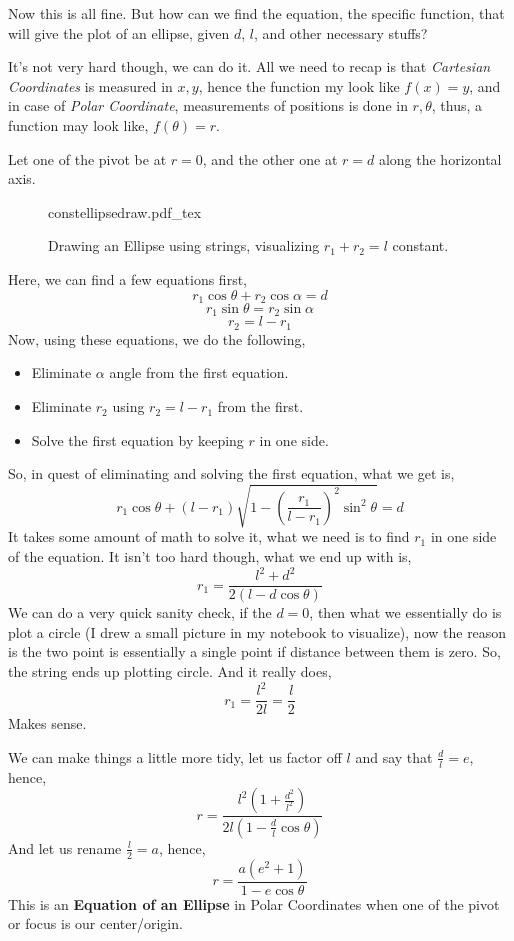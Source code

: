 \documentclass[12pt,a4paper]{article}
\newcommand{\incfig}[1]{%
    \def\svgwidth{0.7\columnwidth}
    {#1.pdf_tex}
}
\begin{document}
Now this is all fine. But how can we find the equation, the specific function, that will give the plot of an ellipse, given $d$, $l$, and other necessary stuffs? 

It's not very hard though, we can do it. All we need to recap is that \emph{Cartesian Coordinates} is measured in $x,y$, hence the function my look like $f(x) = y$, and in case of \emph{Polar Coordinate}, measurements of positions is done in $r,\theta$, thus, a function may look like, $f( \theta) = r$.





Let one of the pivot be at $r= 0$, and the other one at $r= d$ along the horizontal axis. 
\begin{figure}[ht!]
    \centering
    \incfig{constellipsedraw}
    \caption{Drawing an Ellipse using strings, visualizing $r_1 + r_2 = l$ constant.}
    \label{fig:constellipsedraw}
\end{figure}

Here, we can find a few equations first,
\[ 
r_1 \cos \theta + r_2 \cos \alpha = d
\]
\[ 
r_1 \sin \theta = r_2 \sin \alpha
\]
\[ 
r_2 = l - r_1
\]
Now, using these equations, we do the following,
\begin{itemize}
    \item Eliminate $\alpha$ angle from the first equation. 
    \item Eliminate $r_2$ using $r_2 = l - r_1$ from the first. 
    \item Solve the first equation by keeping $r$ in one side.    
\end{itemize}
So, in quest of eliminating and solving the first equation, what we get is,
\[ 
    r_1 \cos \theta + \left( l-r_1 \right) \sqrt{1 - \left( \frac{r_1}{l- r_1} \right) ^2 \sin^2\theta} = d
\]  
It takes some amount of math to solve it, what we need is to find $r_1$ in one side of the equation. It isn't too hard though, what we end up with is,
\[ 
    r_1 = \frac{l^2 + d^2}{2 \left( l- d \cos \theta \right) }
\]
We can do a very quick sanity check, if the $d=0$, then what we essentially do is plot a circle (I drew a small picture in my notebook to visualize), now the reason is the two point is essentially a single point if distance between them is zero. So, the string ends up plotting circle. And it really does,\[ 
r_1 = \frac{l^2}{2 l } = \frac{l}{2}
\] Makes sense.

We can make things a little more tidy, let us factor off $l$ and say that $\frac{d}{l} = e$, 
hence,
\[ 
    r = \frac{l^2 \left(  1 + \frac{d^2}{l^2} \right) }{2l \left( 1-\frac{d}{l}\cos\theta  \right) }
\] 
And let us rename $\frac{l}{2 } = a$, hence,
\[
    \boxed{ r = \frac{a \left( e^2 + 1 \right) }{1 - e \cos \theta} }
\]
This is an \textbf{Equation of an Ellipse} in Polar Coordinates when one of the pivot or focus is our center/origin.
\end{document}
